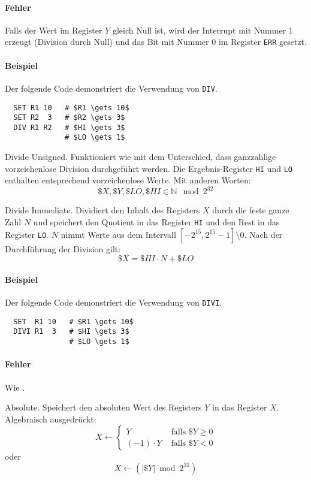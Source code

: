 \paragraph{Fehler}
Falls der Wert im Register $Y$ gleich Null ist, wird der Interrupt mit Nummer 1
erzeugt (Division durch Null) und das Bit mit Nummer 0 im Register \texttt{ERR}
gesetzt.

\paragraph{Beispiel}
Der folgende Code demonstriert die Verwendung von \texttt{DIV}.
\begin{lstlisting}
  SET R1 10   # $R1 \gets 10$
  SET R2  3   # $R2 \gets 3$
  DIV R1 R2   # $HI \gets 3$
              # $LO \gets 1$
\end{lstlisting}




\glqq Divide Unsigned\grqq.
Funktioniert wie  mit dem Unterschied, dass ganzzahlige
vorzeichenlose Division durchgeführt werden. Die Ergebnis-Register \texttt{HI}
und \texttt{LO} enthalten entsprechend vorzeichenlose Werte. Mit anderen Worten:
\[
  \$X, \$Y, \$LO, \$HI \in \mathds{N} \mod 2^{32}
\]





\glqq Divide Immediate\grqq.
Dividiert den Inhalt des Registers $X$ durch die feste ganze Zahl $N$ und
speichert den Quotient in das Register \texttt{HI} und den Rest in das Register
\texttt{LO}.
$N$ nimmt Werte aus dem Intervall $[-2^{15}, 2^{15}-1] \setminus 0$.
Nach der Durchführung der Division gilt:
\[
    \$X = \$HI \cdot N + \$LO 
\]
\paragraph{Beispiel}
Der folgende Code demonstriert die Verwendung von \texttt{DIVI}.
\begin{lstlisting}
  SET  R1 10   # $R1 \gets 10$
  DIVI R1  3   # $HI \gets 3$
               # $LO \gets 1$
\end{lstlisting}


\paragraph{Fehler}
Wie .


\glqq Absolute\grqq.
Speichert den absoluten Wert des Registers $Y$ in das Register $X$.
Algebraisch ausgedrückt:
\[
    X \gets
    \begin{cases}
      Y            & \text{ falls } \$Y \geq 0 \\
      (-1) \cdot Y & \text{ falls } \$Y < 0
    \end{cases}
\]
oder
\[
    X \gets \left( \lvert \$Y \rvert \bmod 2^{31} \right) 
\]


